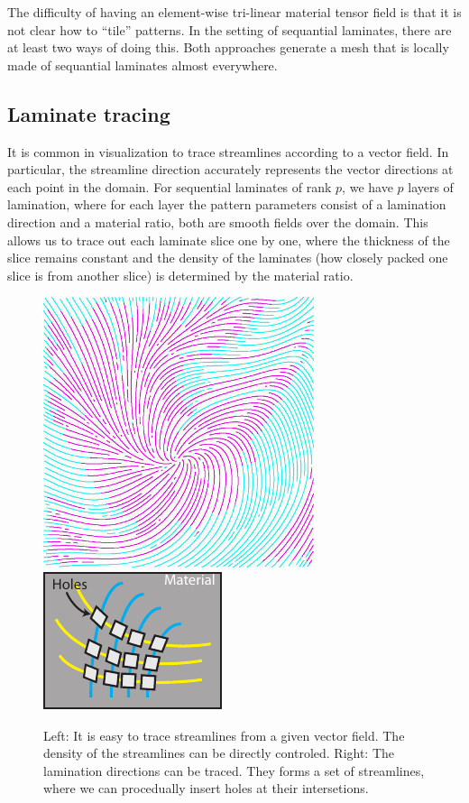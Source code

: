 \documentclass[10pt]{article}
\begin{document}
The difficulty of having an element-wise tri-linear material tensor field is
that it is not clear how to ``tile'' patterns.  In the setting of sequantial
laminates, there are at least two ways of doing this.  Both approaches generate
a mesh that is locally made of sequantial laminates almost everywhere.

\subsection{Laminate tracing}
It is common in visualization to trace streamlines according to a vector field.
In particular, the streamline direction accurately represents the vector
directions at each point in the domain.  For sequential laminates of rank $p$, we have
$p$ layers of lamination, where for each layer the pattern parameters consist of
a lamination direction and a material ratio, both are smooth fields over the
domain.  This
allows us to trace out each laminate slice one by one, where the thickness of
the slice remains constant and the density of the laminates (how closely packed one
slice is from another slice) is determined by the material ratio.

\begin{figure}[t]
\centering
\includegraphics[height=0.3\textwidth]{images/streamlines}
\includegraphics[height=0.3\textwidth]{images/hole_packing}
\caption{Left: It is easy to trace streamlines from a given vector field.  The
density of the streamlines can be directly controled.
Right: The lamination directions can be traced.  They forms a set of
streamlines, where we can procedually insert holes at their intersetions.}
\label{fig:hole_packing}
\end{figure}
\end{document}
